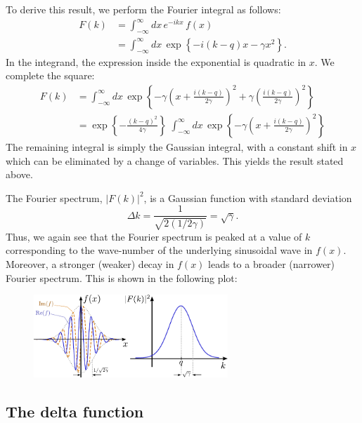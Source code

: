 \documentclass[10pt,a4paper]{article}
\begin{document}
To derive this result, we perform the Fourier integral as follows:
\begin{align}
  F(k) &= \int_{-\infty}^\infty dx \, e^{-ikx}\, f(x) \\
  &= \int_{-\infty}^\infty dx \, \exp\left\{-i(k-q)x -\gamma x^2\right\}.
\end{align}
In the integrand, the expression inside the exponential is quadratic
in $x$. We complete the square:
\begin{align}
  F(k) &= \int_{-\infty}^\infty dx \, \exp\left\{-\gamma\left(x + \frac{i(k-q)}{2\gamma}\right)^2 + \gamma\left(\frac{i(k-q)}{2\gamma}\right)^2\right\} \\
  &= \exp\left\{ - \frac{(k-q)^2}{4\gamma}\right\}\; \int_{-\infty}^\infty dx \, \exp\left\{-\gamma\left(x + \frac{i(k-q)}{2\gamma}\right)^2\right\}
\end{align}
The remaining integral is simply the Gaussian integral, with a
constant shift in $x$ which can be eliminated by a change of
variables. This yields the result stated above.

The Fourier spectrum, $|F(k)|^2$, is a Gaussian function with standard
deviation
\begin{equation}
\Delta k = \frac{1}{\sqrt{2(1/2\gamma)}} = \sqrt{\gamma}.
\end{equation}
Thus, we again see that the Fourier spectrum is peaked at a value of
$k$ corresponding to the wave-number of the underlying sinusoidal wave
in $f(x)$. Moreover, a stronger (weaker) decay in $f(x)$ leads to a
broader (narrower) Fourier spectrum. This is shown in the following
plot:

\begin{figure}[h]
  \centering\includegraphics[width=0.65\textwidth]{fourier_example4}
\end{figure}
    
\subsection{The delta function}
\label{the-delta-function}
\end{document}
